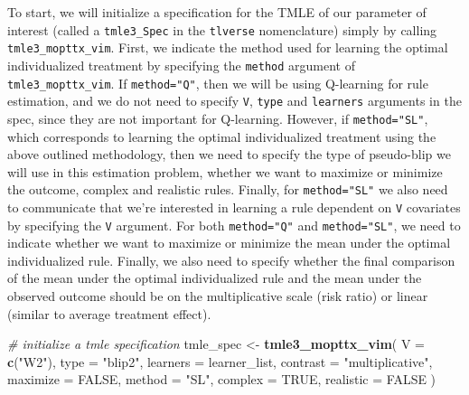 \documentclass[12pt, krantz2,]{krantz}
\newenvironment{Shaded}{\begin{snugshade}}{\end{snugshade}}
\newcommand{\CommentTok}[1]{\textcolor[rgb]{0.37,0.37,0.37}{\textit{#1}}}
\newcommand{\DataTypeTok}[1]{\textcolor[rgb]{0.27,0.27,0.27}{#1}}
\newcommand{\KeywordTok}[1]{\textcolor[rgb]{0.27,0.27,0.27}{\textbf{#1}}}
\newcommand{\NormalTok}[1]{#1}
\newcommand{\OtherTok}[1]{\textcolor[rgb]{0.37,0.37,0.37}{#1}}
\newcommand{\StringTok}[1]{\textcolor[rgb]{0.5,0.5,0.5}{#1}}
\theoremstyle{definition}
\theoremstyle{definition}
\theoremstyle{definition}
\newcommand{\1}{\mathbbm{1}}
\begin{document}
To start, we will initialize a specification for the TMLE of our parameter of
interest (called a \texttt{tmle3\_Spec} in the \texttt{tlverse} nomenclature) simply by calling
\texttt{tmle3\_mopttx\_vim}. First, we indicate the method used for learning the optimal
individualized treatment by specifying the \texttt{method} argument of
\texttt{tmle3\_mopttx\_vim}. If \texttt{method="Q"}, then we will be using Q-learning for rule
estimation, and we do not need to specify \texttt{V}, \texttt{type} and \texttt{learners} arguments
in the spec, since they are not important for Q-learning. However, if
\texttt{method="SL"}, which corresponds to learning the optimal individualized
treatment using the above outlined methodology, then we need to specify the type
of pseudo-blip we will use in this estimation problem, whether we want to
maximize or minimize the outcome, complex and realistic rules. Finally, for
\texttt{method="SL"} we also need to communicate that we're interested in learning a
rule dependent on \texttt{V} covariates by specifying the \texttt{V} argument. For both
\texttt{method="Q"} and \texttt{method="SL"}, we need to indicate whether we want to maximize
or minimize the mean under the optimal individualized rule. Finally, we also
need to specify whether the final comparison of the mean under the optimal
individualized rule and the mean under the observed outcome should be on the
multiplicative scale (risk ratio) or linear (similar to average treatment
effect).

\begin{Shaded}
\begin{Highlighting}[]
\CommentTok{# initialize a tmle specification}
\NormalTok{tmle_spec <-}\StringTok{ }\KeywordTok{tmle3_mopttx_vim}\NormalTok{(}
  \DataTypeTok{V =} \KeywordTok{c}\NormalTok{(}\StringTok{"W2"}\NormalTok{),}
  \DataTypeTok{type =} \StringTok{"blip2"}\NormalTok{,}
  \DataTypeTok{learners =}\NormalTok{ learner_list,}
  \DataTypeTok{contrast =} \StringTok{"multiplicative"}\NormalTok{,}
  \DataTypeTok{maximize =} \OtherTok{FALSE}\NormalTok{,}
  \DataTypeTok{method =} \StringTok{"SL"}\NormalTok{,}
  \DataTypeTok{complex =} \OtherTok{TRUE}\NormalTok{,}
  \DataTypeTok{realistic =} \OtherTok{FALSE}
\NormalTok{)}
\end{Highlighting}
\end{Shaded}
\end{document}
